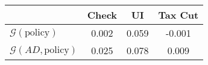 \begin{tabular}{@{}lccc@{}} 
\toprule 
                          & Check      & UI    & Tax Cut    \\  \midrule 
$\mathcal{G}(\text{policy})$ & 0.002  & 0.059  & -0.001     \\ 
$\mathcal{G}(AD,\text{policy})$ & 0.025  & 0.078  & 0.009     \\ 
\end{tabular}  
